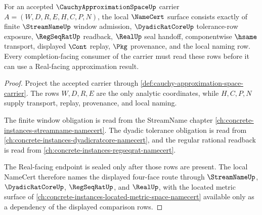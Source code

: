 \begin{theorem}
\label{thm:cauchy-approximation-space-namecert-obligations}
For an accepted $\CauchyApproximationSpaceUp$ carrier $A=(W,D,R,E,H,C,P,N)$, the local $\NameCert$ surface consists exactly of finite $\StreamNameUp$ window admission, $\DyadicRatCoreUp$ tolerance-row exposure, $\RegSeqRatUp$ readback, $\RealUp$ seal handoff, componentwise $\hsame$ transport, displayed $\Cont$ replay, $\Pkg$ provenance, and the local naming row. Every completion-facing consumer of the carrier must read these rows before it can use a Real-facing approximation result.
\end{theorem}
\begin{proof}
Project the accepted carrier through \autoref{def:cauchy-approximation-space-carrier}. The rows $W,D,R,E$ are the only analytic coordinates, while $H,C,P,N$ supply transport, replay, provenance, and local naming.

The finite window obligation is read from the StreamName chapter \autoref{ch:concrete-instances-streamname-namecert}. The dyadic tolerance obligation is read from \autoref{ch:concrete-instances-dyadicratcore-namecert}, and the regular rational readback is read from \autoref{ch:concrete-instances-regseqrat-namecert}.

The Real-facing endpoint is sealed only after those rows are present. The local NameCert therefore names the displayed four-face route through $\StreamNameUp$, $\DyadicRatCoreUp$, $\RegSeqRatUp$, and $\RealUp$, with the located metric surface of \autoref{ch:concrete-instances-located-metric-space-namecert} available only as a dependency of the displayed comparison rows.
\end{proof}

